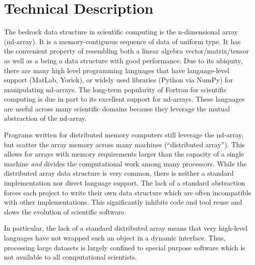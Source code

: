 \documentclass[letterpaper,12pt]{article}
\begin{document}

\section*{Technical Description}

The bedrock data structure in scientific computing is the n-dimensional array (nd-array).  
It is a memory-contiguous sequence of data of uniform type.  It has the convenient property 
of resembling both a linear algebra vector/matrix/tensor as well as a being a data structure with good performance.  Due to its ubiquity, there are many high level programming 
languages that have language-level support (MatLab\cite{matlab}, Yorick\cite{Munro1995}), 
or widely used libraries (Python\cite{CPython} via NumPy\cite{Oliphant2006}) for 
manipulating nd-arrays.  The long-term popularity of Fortran for scientific computing is 
due in part to its excellent support for nd-arrays.  These languages are useful across 
many scientific domains because they leverage the mutual abstraction of the nd-array.

Programs written for distributed memory computers still leverage the nd-array, but scatter 
the array memory across many machines (``distributed array'').  This allows for arrays 
with memory requirements larger than the capacity of a single machine \emph{and} divides 
the computational work among many processors.  While the distributed array data structure 
is very common, there is neither a standard implementation nor direct language support.  
The lack of a standard abstraction forces each project to write their own data structure 
which are often incompatible with other implementations.  This significantly inhibits code and tool reuse and slows the evolution of scientific software.

In particular, the lack of a standard distributed array means that very high-level 
languages have not wrapped such an object in a dynamic interface.  Thus, processing large 
datasets is largely confined to special purpose software which is not available to all 
computational scientists.
\end{document}
